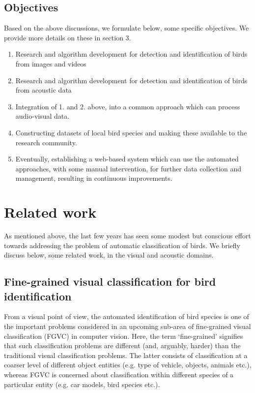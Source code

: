 \documentclass{article}
\begin{document}
\subsection{Objectives}
Based on the above discussions, we formulate below, some specific objectives. We provide more details on these in section 3.  
\begin{enumerate}
\item Research and algorithm development for detection and identification of birds from images and videos
\item Research and algorithm development for detection and identification of birds from acoustic data
\item Integration of 1. and 2. above, into a common approach which can process audio-visual data. 
\item Constructing datasets of local bird species and making these available to the research community.
\item Eventually, establishing a web-based system which can use the automated
approaches, with some manual intervention, for further data collection and management, resulting in continuous improvements.
\end{enumerate}

\section{Related work}
As mentioned above, the last few years has seen some modest but conscious effort towards addressing the problem of automatic classification of birds. We briefly discuss below, some related work, in the visual and acoustic domains.

\subsection{Fine-grained visual classification for bird identification}
From a visual point of view, the automated identification of bird species is one of the important problems considered in an upcoming sub-area of fine-grained visual classification (FGVC) in computer vision. Here, the term `fine-grained' signifies that such classification problems are different (and, arguably, harder) than the traditional visual classification problems. The latter consists of classification at a coarser level of different object entities (e.g. type of vehicle, objects, animals etc.), whereas FGVC is concerned about classification within different species of a particular entity (e.g. car models, bird species etc.).
\end{document}
